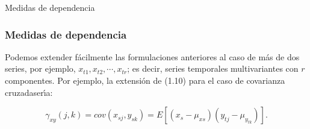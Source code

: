 \documentclass[xcolor=(list of options)]{beamer}
\begin{document}
\begin{section}{Medidas de dependencia}
\begin{frame}
\end{frame}
\begin{frame}
\frametitle{Medidas de dependencia}

Podemos extender f\'acilmente las formulaciones anteriores al caso de m\'as de dos series, por ejemplo, $x_{t1}, x_{t2},\cdots, x_{tr}$; es decir, series temporales multivariantes con $r$ componentes. Por ejemplo, la extensi\'on de (1.10) para el caso de covarianza cruzadaser\'\i{}a:

\begin{equation*}
\gamma_{xy} (j, k) = cov (x_{sj}, y_{sk}) = E [(x_s -\mu_{xs}) (y_{tj} - \mu_{y_{tk}})].
\end{equation*}

\end{frame}

\end{section}
\end{document}

